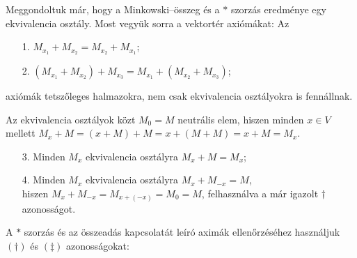 \documentclass[9pt, a4paper, showtrims]{memoir}
\makeatletter
\renewenvironment{proof}[1][\proofname]
    {\par\pushQED{\qed}%
    \normalfont \topsep6\p@\@plus6\p@\relax
    \trivlist
    \item[\hskip\labelsep
        \itshape
    #1\@addpunct{:}]\ignorespaces}
    {\popQED\endtrivlist\@endpefalse}
\theoremstyle{plain}
\theoremstyle{remark}
\theoremstyle{definition}
\makeatother
\begin{document}
\begin{proof}
    Meggondoltuk már, hogy a Minkowski--összeg és a $\ast$ szorzás eredménye egy ekvivalencia osztály.
    Most vegyük sorra a vektortér axiómákat:
    Az
    \begin{enumerate}
        \item[1.] $M_{x_1}+M_{x_{2}}=M_{x_2}+M_{x_1}$;
        \item[2.] $\left( M_{x_1}+M_{x_2} \right)+M_{x_3}=
            M_{x_1}+\left( M_{x_2}+M_{x_3} \right)$;
    \end{enumerate}
    axiómák tetszőleges halmazokra, nem csak ekvivalencia osztályokra is fennállnak.
    
    Az ekvivalencia osztályok közt $M_0=M$ neutrális elem,
    hiszen minden $x\in V$ mellett $M_x+M=\left( x+M \right)+M=x+\left( M+M \right)=x+M=M_x$.
    \begin{enumerate}
        \item[3.] Minden $M_x$ ekvivalencia osztályra $M_x+M=M_x$;
        \item[4.] Minden $M_x$ ekvivalencia osztályra $M_x+M_{-x}=M$,\\
            hiszen 
            $M_x+M_{-x}=M_{x+\left( -x \right)}=M_0=M$, 
            felhasználva a már igazolt $\dag$ azonosságot.
    \end{enumerate}
    A $\ast$ szorzás és az összeadás kapcsolatát leíró aximák ellenőrzéséhez használjuk
    $(\dag)$ és $(\ddag)$ azonosságokat:
\end{proof}
\end{document}
